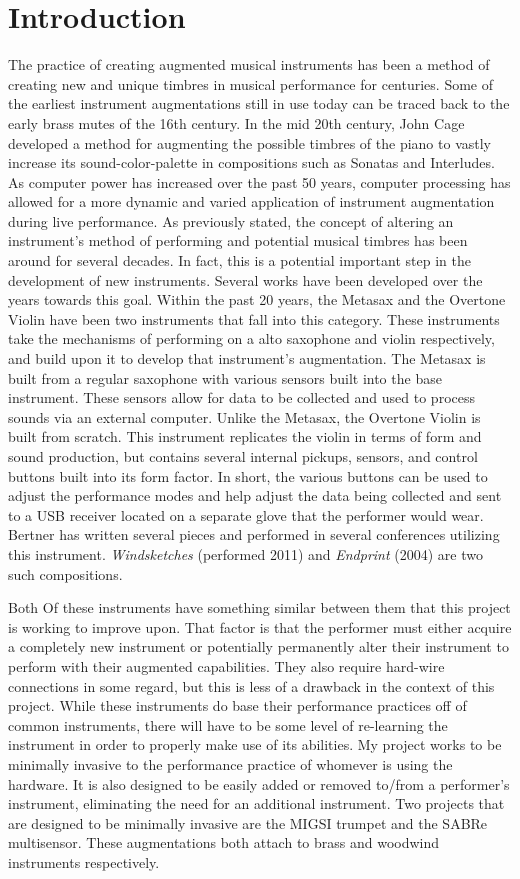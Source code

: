 \chapter{Introduction}
\label{chap:intro}
The practice of creating augmented musical instruments has been a method of creating new and unique timbres in musical performance for centuries. Some of the earliest instrument augmentations still in use today can be traced back to the early brass mutes of the 16th century. In the mid 20th century, John Cage developed a method for augmenting the possible timbres of the piano to vastly increase its sound-color-palette in compositions such as Sonatas and Interludes. 
As computer power has increased over the past 50 years,
computer processing has allowed for a more dynamic and varied application of instrument augmentation during live performance. As previously stated, the concept of altering an instrument’s method of performing and potential musical timbres has been around for several decades. In fact, this is a potential important step in the development of new instruments. 
Several works have been developed over the years towards this goal. Within the past 20 years, the Metasax and the Overtone Violin have been two instruments that fall into this category. These instruments take the mechanisms of performing on a alto saxophone and violin respectively, and build upon it to develop that instrument’s augmentation. The Metasax is built from a regular saxophone with various sensors built into the base instrument. These sensors allow for data to be collected and used to process sounds via an external computer. 
Unlike the Metasax, the Overtone Violin is built from scratch. This instrument replicates the violin in terms of form and sound production, but contains several internal pickups, sensors, and control buttons built into its form factor. In short, the various buttons can be used to adjust the performance modes and help adjust the data being collected and sent to a USB receiver located on a separate glove that the performer would wear. Bertner has written several pieces and performed in several conferences utilizing this instrument. \textit{Windsketches} (performed 2011) and \textit{Endprint} (2004) are two such compositions.

Both Of these instruments have something similar between them that this project is working to improve upon. That factor is that the performer must either acquire a completely new instrument or potentially permanently alter their instrument to perform with their augmented capabilities. They also require hard-wire connections in some regard, but this is less of a drawback in the context of this project. While these instruments do base their performance practices off of common instruments, there will have to be some level of re-learning the instrument in order to properly make use of its abilities. 
My project works to be minimally invasive to the performance practice of whomever is using the hardware. It is also designed to be easily added or removed to/from a performer’s instrument, eliminating the need for an additional instrument. Two projects that are designed to be minimally invasive are the MIGSI trumpet and the SABRe multisensor. These augmentations both attach to brass and woodwind instruments respectively. 

